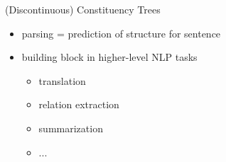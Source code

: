 \documentclass[aspectratio=169, 10pt]{beamer}
\begin{document}
\begin{frame}{(Discontinuous) Constituency Trees}
\begin{minipage}{.58\linewidth}
\begin{itemize}
{\begin{tabular}{llc}
                    \bottomrule
                \end{tabular}}
                \item<+-> parsing = prediction of structure for sentence
                \item<+-> building block in higher-level NLP tasks
                \begin{itemize}
                    \item translation \citep{Zhang19, Yang22}
                    \item relation extraction \citep{Nguyen19}
                    \item summarization \citep{Balachandran21}
                    \item ...
                \end{itemize}
            \end{itemize}
        \end{minipage}
    \end{frame}
\end{document}
